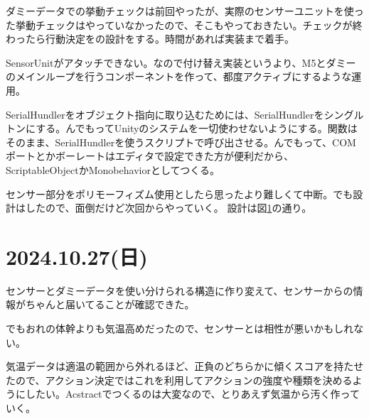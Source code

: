 \documentclass[fleqn,twocolumn]{mynote}
\begin{document}
  ダミーデータでの挙動チェックは前回やったが、実際のセンサーユニットを使った挙動チェックはやっていなかったので、そこもやっておきたい。チェックが終わったら行動決定をの設計をする。時間があれば実装まで着手。

  SensorUnitがアタッチできない。なので付け替え実装というより、M5とダミーのメインループを行うコンポーネントを作って、都度アクティブにするような運用。

  SerialHundlerをオブジェクト指向に取り込むためには、SerialHundlerをシングルトンにする。んでもってUnityのシステムを一切使わせないようにする。関数はそのまま、SerialHundlerを使うスクリプトで呼び出させる。んでもって、COMポートとかボーレートはエディタで設定できた方が便利だから、ScriptableObjectかMonobehaviorとしてつくる。

  センサー部分をポリモーフィズム使用としたら思ったより難しくて中断。でも設計はしたので、面倒だけど次回からやっていく。
  設計は図\ref{fig:serial-config}の通り。

  \fboxsep=0pt            %
  \fboxrule=1pt            %
  \begin{figure}[h]
    \centering
    \caption{}
    \label{fig:serial-config}
  \end{figure}

  \section*{2024.10.27(日)}
  センサーとダミーデータを使い分けられる構造に作り変えて、センサーからの情報がちゃんと届いてることが確認できた。

  でもおれの体幹よりも気温高めだったので、センサーとは相性が悪いかもしれない。

  気温データは適温の範囲から外れるほど、正負のどちらかに傾くスコアを持たせたので、アクション決定ではこれを利用してアクションの強度や種類を決めるようにしたい。Acstractでつくるのは大変なので、とりあえず気温から汚く作っていく。
\end{document}
